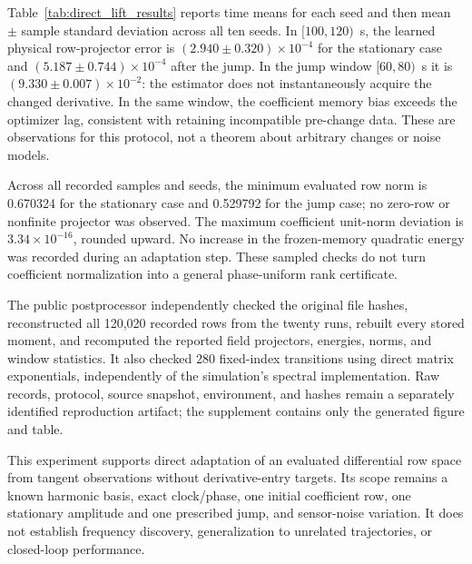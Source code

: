\documentclass[journal]{IEEEtran}
\begin{document}
Table~\ref{tab:direct_lift_results} reports time means for each seed and
then mean $\pm$ sample standard deviation across all ten seeds. In
$[100,120)$~s, the learned physical row-projector error is
$(2.940\pm0.320)\times10^{-4}$ for the stationary case and
$(5.187\pm0.744)\times10^{-4}$ after the jump. In the jump window
$[60,80)$~s it is $(9.330\pm0.007)\times10^{-2}$: the estimator does
not instantaneously acquire the changed derivative. In the same window,
the coefficient memory bias exceeds the optimizer lag, consistent with
retaining incompatible pre-change data. These are observations for this
protocol, not a theorem about arbitrary changes or noise models.

Across all recorded samples and seeds, the minimum evaluated row norm is
0.670324 for the stationary case and 0.529792 for the jump case; no
zero-row or nonfinite projector was observed. The maximum coefficient
unit-norm deviation is $3.34\times10^{-16}$, rounded upward. No
increase in the frozen-memory quadratic energy was recorded during an
adaptation step. These sampled checks do not turn coefficient
normalization into a general phase-uniform rank certificate.

The public postprocessor 
independently checked the original file hashes, reconstructed all
120,020 recorded rows from the twenty runs, rebuilt every stored moment,
and recomputed the reported field projectors, energies, norms, and
window statistics. It also checked 280 fixed-index transitions using
direct matrix exponentials, independently of the simulation's spectral
implementation. Raw records, protocol, source snapshot, environment,
and hashes remain a separately identified reproduction artifact; the
supplement contains only the generated figure and table.

This experiment supports direct adaptation of an evaluated differential
row space from tangent observations without derivative-entry targets.
Its scope remains a known harmonic basis, exact clock/phase, one initial
coefficient row, one stationary amplitude and one prescribed jump, and
sensor-noise variation. It does not establish frequency discovery,
generalization to unrelated trajectories, or closed-loop performance.
\end{document}
